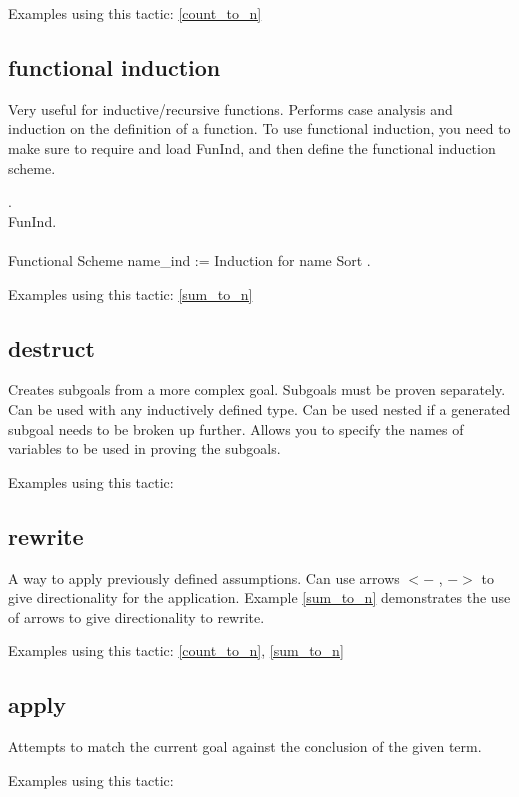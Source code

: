 \noindent
Examples using this tactic: 
\ref{count_to_n}



\subsection{functional induction} \label{functional induction}
Very useful for inductive/recursive functions.
Performs case analysis and induction on the definition of a function.
To use functional induction, you need to make sure to require and load FunInd, and then define the functional induction scheme.

\begin{code}
 .	\\
\Load FunInd.
\\ \\
Functional Scheme name\_ind := 
  Induction for name Sort .
\end{code}

\noindent
Examples using this tactic: 
\ref{sum_to_n}


\subsection{destruct} \label{destruct}
Creates subgoals from a more complex goal. 
Subgoals must be proven separately.
Can be used with any inductively defined type.
Can be used nested if a generated subgoal needs to be broken up further.
Allows you to specify the names of variables to be used in proving the subgoals.

\noindent
Examples using this tactic: 



\subsection{rewrite} \label{rewrite}
A way to apply previously defined assumptions.
Can use arrows $<-$ , $->$ to give directionality for the application.
Example \ref{sum_to_n} demonstrates the use of arrows to give directionality to rewrite.

\noindent
Examples using this tactic: 
\ref{count_to_n}, 
\ref{sum_to_n}


\subsection{apply} \label{apply}
Attempts to match the current goal against the conclusion of the given term.

\noindent
Examples using this tactic:








